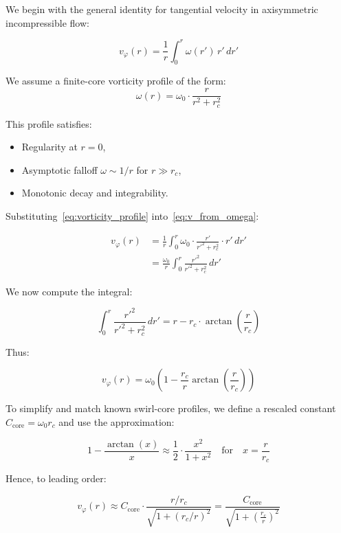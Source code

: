 \documentclass[12pt]{article}
\begin{document}
We begin with the general identity for tangential velocity in axisymmetric incompressible flow:

\begin{equation}
    v_\varphi(r) = \frac{1}{r} \int_0^r \omega(r') \, r' \, dr'
    \label{eq:v_from_omega}
\end{equation}

We assume a finite-core vorticity profile of the form:
\begin{equation}
    \omega(r) = \omega_0 \cdot \frac{r}{r^2 + r_c^2}
    \label{eq:vorticity_profile}
\end{equation}

This profile satisfies:
\begin{itemize}
    \item Regularity at \( r = 0 \),
    \item Asymptotic falloff \( \omega \sim 1/r \) for \( r \gg r_c \),
    \item Monotonic decay and integrability.
\end{itemize}

Substituting~\eqref{eq:vorticity_profile} into~\eqref{eq:v_from_omega}:

\begin{align}
    v_\varphi(r)
    &= \frac{1}{r} \int_0^r \omega_0 \cdot \frac{r'}{r'^2 + r_c^2} \cdot r' \, dr' \\
    &= \frac{\omega_0}{r} \int_0^r \frac{r'^2}{r'^2 + r_c^2} \, dr'
\end{align}

We now compute the integral:

\[
\int_0^r \frac{r'^2}{r'^2 + r_c^2} \, dr'
= r - r_c \cdot \arctan\left( \frac{r}{r_c} \right)
\]

Thus:

\begin{equation}
    v_\varphi(r)
    = \omega_0 \left( 1 - \frac{r_c}{r} \arctan\left( \frac{r}{r_c} \right) \right)
    \label{eq:velocity_arctan}
\end{equation}

To simplify and match known swirl-core profiles, we define a rescaled constant \( C_{\text{core}} = \omega_0 r_c \) and use the approximation:

\[
1 - \frac{\arctan(x)}{x} \approx \frac{1}{2} \cdot \frac{x^2}{1 + x^2}
\quad \text{for} \quad x = \frac{r}{r_c}
\]

Hence, to leading order:

\[
v_\varphi(r) \approx C_{\text{core}} \cdot \frac{r/r_c}{\sqrt{1 + (r_c/r)^2}}
= \frac{C_{\text{core}}}{\sqrt{1 + \left(\frac{r_c}{r}\right)^2}}
\]
\end{document}
